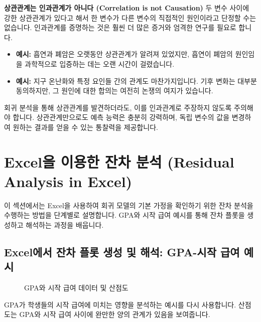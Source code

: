 \documentclass[11pt,a4paper]{book}
\theoremstyle{definition}
\begin{document}
\begin{cautionbox}
\textbf{상관관계는 인과관계가 아니다 (Correlation is not Causation)}
두 변수 사이에 강한 상관관계가 있다고 해서 한 변수가 다른 변수의 직접적인 원인이라고 단정할 수는 없습니다. 인과관계를 증명하는 것은 훨씬 더 많은 증거와 엄격한 연구를 필요로 합니다.
\begin{itemize}
    \item \textbf{예시:} 흡연과 폐암은 오랫동안 상관관계가 알려져 있었지만, 흡연이 폐암의 원인임을 과학적으로 입증하는 데는 오랜 시간이 걸렸습니다.
    \item \textbf{예시:} 지구 온난화와 특정 요인들 간의 관계도 마찬가지입니다. 기후 변화는 대부분 동의하지만, 그 원인에 대한 합의는 여전히 논쟁의 여지가 있습니다.
\end{itemize}
회귀 분석을 통해 상관관계를 발견하더라도, 이를 인과관계로 주장하지 않도록 주의해야 합니다. 상관관계만으로도 예측 능력은 충분히 강력하며, 독립 변수의 값을 변경하여 원하는 결과를 얻을 수 있는 통찰력을 제공합니다.
\end{cautionbox}


\section{Excel을 이용한 잔차 분석 (Residual Analysis in Excel)}
이 섹션에서는 Excel을 사용하여 회귀 모델의 기본 가정을 확인하기 위한 잔차 분석을 수행하는 방법을 단계별로 설명합니다. GPA와 시작 급여 예시를 통해 잔차 플롯을 생성하고 해석하는 과정을 배웁니다.

\subsection{Excel에서 잔차 플롯 생성 및 해석: GPA-시작 급여 예시}
\begin{figure}[h!]
    \centering
    \caption{GPA와 시작 급여 데이터 및 산점도}
    \label{fig:gpa_salary_data_scatter}
\end{figure}
GPA가 학생들의 시작 급여에 미치는 영향을 분석하는 예시를 다시 사용합니다. 산점도는 GPA와 시작 급여 사이에 완만한 양의 관계가 있음을 보여줍니다.
\end{document}
